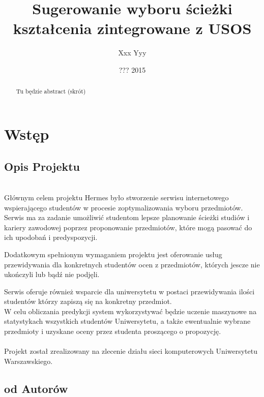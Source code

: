 \documentclass[licencjacka]{pracamgr}
\author{Xxx Yyy}
\title{Sugerowanie wyboru ścieżki kształcenia zintegrowane z USOS}
\date{??? 2015}
\begin{document}
\maketitle
\begin{abstract}
Tu będzie abstract (skrót)
\end{abstract}
\tableofcontents

\chapter{Wstęp}


 \section{Opis Projektu}


~\\ \indent Głównym celem projektu Hermes było stworzenie serwisu internetowego 
wspierającego studentów w procesie zoptymalizowania wyboru przedmiotów.
Serwis ma za zadanie 
umożliwić studentom lepsze planowanie ścieżki studiów i kariery zawodowej
poprzez proponowanie przedmiotów, które mogą pasować do ich upodobań i predyspozycji. 

Dodatkowym spełnionym wymaganiem projektu jest oferowanie usług przewidywania dla konkretnych studentów ocen z przedmiotów, których jescze nie ukończyli lub bądź nie podjęli.

Serwis oferuje również wsparcie dla uniwersytetu w postaci
przewidywania ilości studentów którzy zapiszą się na konkretny przedmiot. \\
\indent W celu obliczania predykcji system wykorzystywać będzie uczenie maszynowe na statystykach wszystkich studentów Uniwersytetu, a także ewentualnie wybrane przedmioty i uzyskane oceny przez studenta proszącego o propozycję. \\ \\
\indent Projekt został zrealizowany na zlecenie działu sieci komputerowych Uniwersytetu Warszawskiego.
\newpage
\section{od Autorów}
\end{document}
